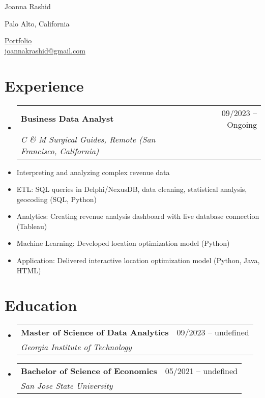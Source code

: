 \documentclass[a4paper,11pt]{article}
\makeatletter
\newcommand{\resumeItem}[1]{
  \item{
    {#1 \vspace{-4pt}}
  }
}
\newcommand{\resumeSubheading}[4]{
  \vspace{-2pt}\item
    \begin{tabular*}{0.97\textwidth}[t]{l@{\extracolsep{\fill}}r}
      \textbf{#1} & #2 \\
      \textit{\small #3} & \textit{\small #4} \\
    \end{tabular*}\vspace{-10pt}
}
\makeatother
\begin{document}
\begin{center}
    {\huge Joanna Rashid} \\ \vspace{0pt}
    \begin{multicols}{2}
    \begin{flushleft}
    \large{Palo Alto, California} \\
    \end{flushleft}
    
    \begin{flushright}
    \href{https://joannarashid.github.io/portfolio/}{Portfolio} \\
    \href{mailto:joannakrashid@gmail.com}{joannakrashid@gmail.com}
    \end{flushright}
    \end{multicols}
\end{center}

\section{Experience}
\begin{itemize}[leftmargin=0.15in, label={}]
    \resumeSubheading
    {Business Data Analyst}{09/2023 -- Ongoing}
    {C \& M Surgical Guides, Remote (San Francisco, California)}{}
    \resumeItemListStart
        \small\resumeItem{Interpreting and analyzing complex revenue data}
        \resumeItem{ETL: SQL queries in Delphi/NexusDB, data cleaning, statistical analysis, geocoding (SQL, Python)}
        \resumeItem{Analytics: Creating revenue analysis dashboard with live database connection (Tableau)}
        \resumeItem{Machine Learning: Developed location optimization model (Python)}
        \resumeItem{Application: Delivered interactive location optimization model (Python, Java, HTML)}
    \resumeItemListEnd
    
\end{itemize}

\section{Education}
\begin{itemize}[leftmargin=0.15in, label={}]
    \resumeSubheading
    {Master of Science of Data Analytics}{09/2023 -- undefined}
    {Georgia Institute of Technology}{}
    \resumeSubheading
    {Bachelor of Science of Economics}{05/2021 -- undefined}
    {San Jose State University}{}
\end{itemize}

\end{document}
